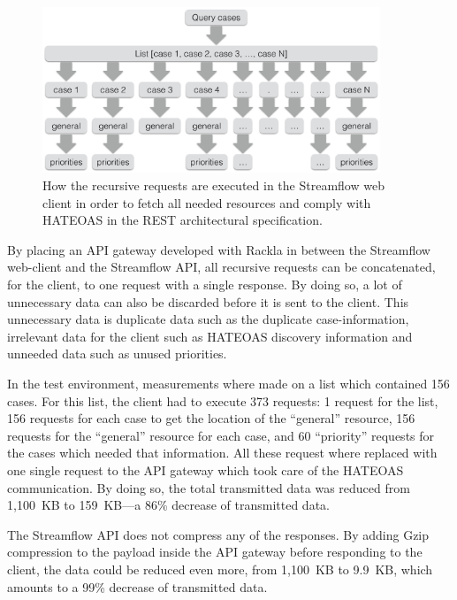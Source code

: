 \documentclass{cslthse-msc}
\begin{document}
\begin{figure}[H]
  \centering
    \begin{center}
      \includegraphics[width=0.9\textwidth]{images/streamflow_cases.png}
    \end{center}
  \caption{How the recursive requests are executed in the Streamflow web client in order to fetch all needed resources and comply with HATEOAS in the REST architectural specification.}
\end{figure}

By placing an API gateway developed with Rackla in between the Streamflow web-client and the Streamflow API, all recursive requests can be concatenated, for the client, to one request with a single response. By doing so, a lot of unnecessary data can also be discarded before it is sent to the client. This unnecessary data is duplicate data such as the duplicate case-information, irrelevant data for the client such as HATEOAS discovery information and unneeded data such as unused priorities.

In the test environment, measurements where made on a list which contained 156 cases. For this list, the client had to execute 373 requests: 1 request for the list, 156 requests for each case to get the location of the \enquote{general} resource, 156 requests for the \enquote{general} resource for each case, and 60 \enquote{priority} requests for the cases which needed that information. All these request where replaced with one single request to the API gateway which took care of the HATEOAS communication. By doing so, the total transmitted data was reduced from 1,100~KB to 159~KB---a 86\% decrease of transmitted data.

The Streamflow API does not compress any of the responses. By adding Gzip compression to the payload inside the API gateway before responding to the client, the data could be reduced even more, from 1,100~KB to 9.9~KB, which amounts to a 99\% decrease of transmitted data.
\end{document}
